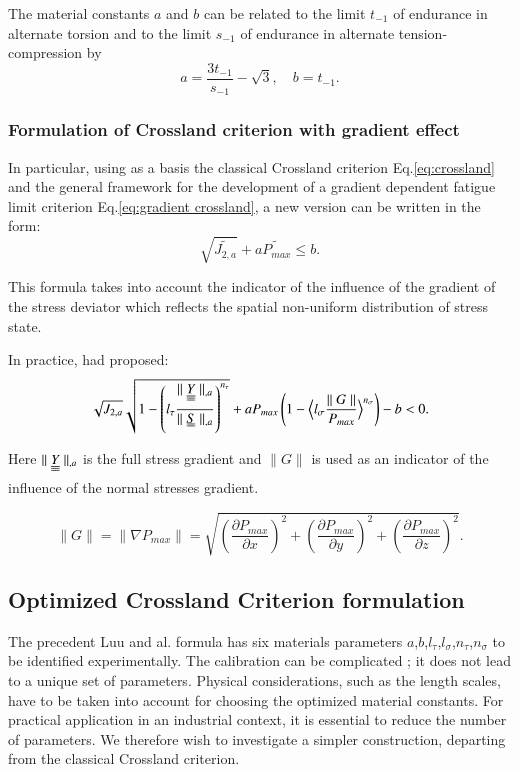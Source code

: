 \documentclass[3p,times,procedia,number]{elsarticle}
\begin{document}
The material constants $a$ and $b$ can be related to  the limit $t_{-1}$ of endurance in alternate torsion and to the limit $s_{-1}$ of endurance in alternate tension-compression by
\begin{equation}
a=\frac{3 t_{-1}}{s_{-1}}-\sqrt{3},\quad 
b=t_{-1}.
\label{crossland-ab}
\end{equation}


\subsubsection{Formulation of Crossland criterion with gradient effect}

In particular, using as a basis the classical Crossland criterion Eq.\eqref{eq:crossland} and the general framework for the development of a gradient dependent fatigue limit criterion Eq.\eqref{eq:gradient crossland}, a new version can be written in the form:
\begin{equation}
\sqrt{\widetilde{J_{2,a}}}+a\widetilde{P_{max}}\leqslant b .
\end{equation}

This formula takes into account the indicator of the influence of the gradient of the stress deviator which reflects the spatial non-uniform distribution of stress state.

In practice, \cite{luu2013formulation} had proposed:
\begin{equation}
\sqrt{{J_{2,a}}}\sqrt{1-\left(l_\tau\frac{\parallel \uuline{\uline{Y}}\parallel_{,a}}{\parallel \uuline{S}\parallel_{,a}}\right)^{n_\tau}}+aP_{max}\left(1-\Big< l_\sigma\frac{\parallel G\parallel}{P_{max}}\Big>^{n_\sigma}\right)-b < 0 .
\end{equation}

Here $\parallel \uuline{\uline{Y}}\parallel_{,a}$ is the full stress gradient and $\parallel G\parallel$ is used as an indicator of the influence of the normal stresses gradient.

\begin{equation}
\parallel{G}\parallel=\parallel{\nabla P_{max}}\parallel=\sqrt{\left(\frac{\partial P_{max}}{\partial x}\right)^2+\left(\frac{\partial P_{max}}{\partial y}\right)^2+\left(\frac{\partial P_{max}}{\partial z}\right)^2} .
\end{equation}



\subsection{Optimized Crossland Criterion formulation}
The precedent Luu and al. formula has six materials parameters $a$,$b$,$l_\tau$,$l_\sigma$,$n_\tau$,$n_\sigma$ to be identified experimentally. The calibration can be complicated ; it does not lead to a unique set of parameters. Physical considerations, such as the length scales, have to be taken into account for choosing the optimized material constants. For practical application in an industrial context, it is essential to reduce the number of parameters. We therefore wish to investigate a simpler construction, departing from the classical Crossland criterion.
\end{document}
